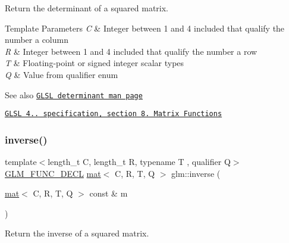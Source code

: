 Return the determinant of a squared matrix.


\begin{DoxyTemplParams}{Template Parameters}
{\em C} & Integer between 1 and 4 included that qualify the number a column \\
\hline
{\em R} & Integer between 1 and 4 included that qualify the number a row \\
\hline
{\em T} & Floating-\/point or signed integer scalar types \\
\hline
{\em Q} & Value from qualifier enum\\
\hline
\end{DoxyTemplParams}
\begin{DoxySeeAlso}{See also}
\href{http://www.opengl.org/sdk/docs/manglsl/xhtml/determinant.xml}{\tt G\+L\+SL determinant man page} 

\href{http://www.opengl.org/registry/doc/GLSLangSpec.4.20.8.pdf}{\tt G\+L\+SL 4.. specification, section 8. Matrix Functions} 
\end{DoxySeeAlso}
\mbox{\label{group__core__func__matrix_gace61e11fc177491beeca0c6971e2f3fc}} 
\subsubsection{\texorpdfstring{inverse()}{inverse()}}
{\footnotesize\ttfamily template$<$length\+\_\+t C, length\+\_\+t R, typename T , qualifier Q$>$ \\
\mbox{\hyperlink{setup_8hpp_ab2d052de21a70539923e9bcbf6e83a51}{G\+L\+M\+\_\+\+F\+U\+N\+C\+\_\+\+D\+E\+CL}} \mbox{\hyperlink{structglm_1_1mat}{mat}}$<$ C, R, T, Q $>$ glm\+::inverse (\begin{DoxyParamCaption}\item[{\mbox{\hyperlink{structglm_1_1mat}{mat}}$<$ C, R, T, Q $>$ const \&}]{m }\end{DoxyParamCaption})}

Return the inverse of a squared matrix.


